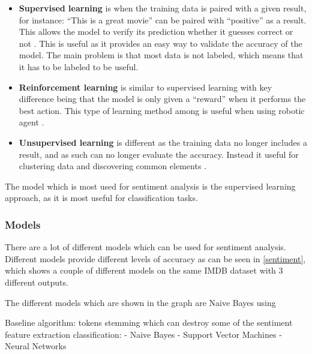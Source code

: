 \begin{itemize}
  \item \textbf{Supervised learning} is when the training data is paired with a
  given result, for instance: ``This is a great movie'' can be paired with
  ``positive'' as a result. This allows the model to verify its prediction
  whether it guesses correct or not \citep[Ch. 7.0]{MIBook}. This is useful as
  it provides an easy way to validate the accuracy of the model. The main problem
  is that most data is not labeled, which means that it has to be labeled to be
  useful.
  \item \textbf{Reinforcement learning} is similar to supervised learning with
  key difference being that the model is only given a ``reward'' when it
  performs the best action. This type of learning method among is useful when
  using robotic agent \citep{Reinforcement}.
  \item \textbf{Unsupervised learning} is different as the training data no
  longer includes a result, and as such can no longer evaluate the accuracy.
  Instead it useful for clustering data and discovering common elements
  \citep[Ch. 11.1]{MIBook}.
\end{itemize}

The model which is most used for sentiment analysis is the supervised learning
approach, as it is most useful for classification tasks.

\subsubsection{Models}

There are a lot of different models which can be used for sentiment analysis. 
Different models provide different levels of accuracy as can be seen in
\autoref{sentiment}, which shows a couple of different models on the same IMDB
dataset with 3 different outputs\citep{Classification}.


The different models which are shown in the graph are Naive Bayes using 





Baseline algorithm:
tokens
stemming which can destroy some of the sentiment
feature extraction
classification:
- Naive Bayes
- Support Vector Machines
- Neural Networks

